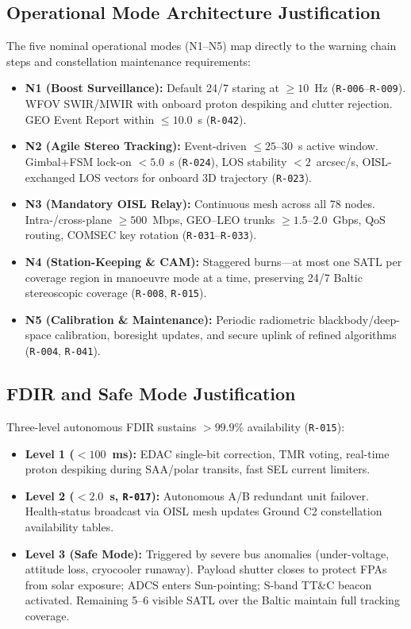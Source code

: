 \subsection{Operational Mode Architecture Justification}

The five nominal operational modes (N1--N5) map directly to the warning chain steps and constellation maintenance requirements:
\begin{itemize}
    \item \textbf{N1 (Boost Surveillance):} Default 24/7 staring at $\ge 10$~Hz (\texttt{R-006}--\texttt{R-009}). WFOV SWIR/MWIR with onboard proton despiking and clutter rejection. GEO Event Report within $\le 10.0$~s (\texttt{R-042}).
    \item \textbf{N2 (Agile Stereo Tracking):} Event-driven $\le 25$--$30$~s active window. Gimbal+FSM lock-on $< 5.0$~s (\texttt{R-024}), LOS stability $< 2$~arcsec/s, OISL-exchanged LOS vectors for onboard 3D trajectory (\texttt{R-023}).
    \item \textbf{N3 (Mandatory OISL Relay):} Continuous mesh across all 78 nodes. Intra-/cross-plane $\ge 500$~Mbps, GEO--LEO trunks $\ge 1.5$--$2.0$~Gbps, QoS routing, COMSEC key rotation (\texttt{R-031}--\texttt{R-033}).
    \item \textbf{N4 (Station-Keeping \& CAM):} Staggered burns---at most one SATL per coverage region in manoeuvre mode at a time, preserving 24/7 Baltic stereoscopic coverage (\texttt{R-008}, \texttt{R-015}).
    \item \textbf{N5 (Calibration \& Maintenance):} Periodic radiometric blackbody/deep-space calibration, boresight updates, and secure uplink of refined algorithms (\texttt{R-004}, \texttt{R-041}).
\end{itemize}

\subsection{FDIR and Safe Mode Justification}

Three-level autonomous FDIR sustains $> 99.9\%$ availability (\texttt{R-015}):
\begin{itemize}
    \item \textbf{Level 1 ($< 100$~ms):} EDAC single-bit correction, TMR voting, real-time proton despiking during SAA/polar transits, fast SEL current limiters.
    \item \textbf{Level 2 ($< 2.0$~s, \texttt{R-017}):} Autonomous A/B redundant unit failover. Health-status broadcast via OISL mesh updates Ground C2 constellation availability tables.
    \item \textbf{Level 3 (Safe Mode):} Triggered by severe bus anomalies (under-voltage, attitude loss, cryocooler runaway). Payload shutter closes to protect FPAs from solar exposure; ADCS enters Sun-pointing; S-band TT\&C beacon activated. Remaining 5--6 visible SATL over the Baltic maintain full tracking coverage.
\end{itemize}
